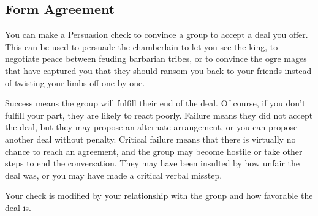    \subsection{Form Agreement}
        You can make a Persuasion check to convince a group to accept a deal you offer. This can be used to persuade the chamberlain to let you see the king, to negotiate peace between feuding barbarian tribes, or to convince the ogre mages that have captured you that they should ransom you back to your friends instead of twisting your limbs off one by one.

        Success means the group will fulfill their end of the deal. Of course, if you don't fulfill your part, they are likely to react poorly. Failure means they did not accept the deal, but they may propose an alternate arrangement, or you can propose another deal without penalty. Critical failure means that there is virtually no chance to reach an agreement, and the group may become hostile or take other steps to end the conversation. They may have been insulted by how unfair the deal was, or you may have made a critical verbal misstep.

        Your check is modified by your relationship with the group and how favorable the deal is.

